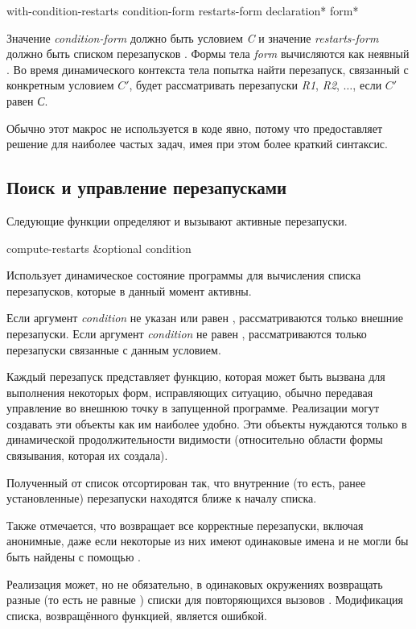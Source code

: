 \begin{defmac}
with-condition-restarts condition-form restarts-form
  {declaration}* {form}*

Значение \emph{condition-form} должно быть условием \emph{C} и значение
\emph{restarts-form} должно быть списком перезапусков . Формы тела \emph{form} вычисляются как неявный . 
Во время динамического контекста тела попытка найти перезапуск, связанный с
конкретным условием $C'$, будет рассматривать перезапуски \emph{R1}, \emph{R2},
$\ldots$, если $C'$ равен  \emph{С}.

Обычно этот макрос не используется в коде явно, потому что 
предоставляет решение для наиболее частых задач, имея при этом более краткий
синтаксис.
\end{defmac}

\subsection{Поиск и управление перезапусками}

Следующие функции определяют и вызывают активные перезапуски.

\begin{defun}[Функция]
compute-restarts &optional condition

Использует динамическое состояние программы для вычисления списка перезапусков,
которые в данный момент активны.

Если аргумент \emph{condition} не указан или равен , рассматриваются
только внешние перезапуски. Если аргумент \emph{condition} не равен ,
рассматриваются только перезапуски связанные с данным условием.

Каждый перезапуск представляет функцию, которая может быть вызвана для
выполнения некоторых форм, исправляющих ситуацию, обычно передавая управление во
внешнюю точку в запущенной программе. Реализации могут создавать эти объекты как
им наиболее удобно. Эти объекты нуждаются только в динамической
продолжительности видимости (относительно области формы связывания, которая их
создала).

Полученный от  список отсортирован так, что внутренние (то
есть, ранее установленные) перезапуски находятся ближе к началу списка.

Также отмечается, что  возвращает все корректные
перезапуски, включая анонимные, даже если некоторые из них имеют одинаковые
имена и не могли бы быть найдены с помощью .

Реализация может, но не обязательно, в одинаковых окружениях возвращать разные
(то есть не равные ) списки для повторяющихся вызовов
. Модификация списка, возвращённого функцией, является
ошибкой.
\end{defun}


